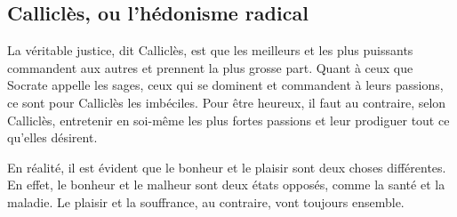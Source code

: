 \subsection*{Calliclès, ou l'hédonisme radical}




La véritable justice, dit Calliclès, est que les meilleurs et les plus puissants commandent aux autres et prennent la plus grosse part. Quant à ceux que Socrate appelle les sages, ceux qui se dominent et commandent à leurs passions, ce sont pour Calliclès les imbéciles. Pour être heureux, il faut au contraire, selon Calliclès, entretenir en soi-même les plus fortes passions et leur prodiguer tout ce qu'elles désirent.%



En réalité, il est évident que le bonheur et le plaisir sont deux choses différentes. En effet, le bonheur et le malheur sont deux états opposés, comme la santé et la maladie. Le plaisir et la souffrance, au contraire, vont toujours ensemble.%

